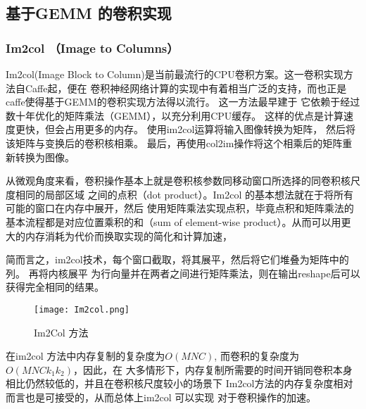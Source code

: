 \subsection{基于GEMM 的卷积实现}

\subsubsection{Im2col （Image to Columns）}

Im2col(Image Block to Column)是当前最流行的CPU卷积方案。这一卷积实现方法自Caffe\cite{Jia2014CaffeCA}起，便在
卷积神经网络计算的实现中有着相当广泛的支持，而也正是caffe使得基于GEMM的卷积实现方法得以流行。
这一方法最早建于\cite{Chellapilla2006HighPC} 它依赖于经过数十年优化的矩阵乘法（GEMM），以充分利用CPU缓存。
这样的优点是计算速度更快，但会占用更多的内存。 使用im2col运算将输入图像转换为矩阵，
然后将该矩阵与变换后的卷积核相乘。 最后，再使用col2im操作将这个相乘后的矩阵重新转换为图像。

从微观角度来看，卷积操作基本上就是卷积核参数同移动窗口所选择的同卷积核尺度相同的局部区域
之间的点积（dot product）。Im2col 的基本想法就在于将所有可能的窗口在内存中展开，然后
使用矩阵乘法实现点积，毕竟点积和矩阵乘法的基本流程都是对应位置乘积的和（sum of element-wise
product）。从而可以用更大的内存消耗为代价而换取实现的简化和计算加速，

简而言之，im2col技术，每个窗口截取，将其展平，然后将它们堆叠为矩阵中的列。 再将内核展平
为行向量并在两者之间进行矩阵乘法，则在输出reshape后可以获得完全相同的结果。
\begin{figure}
	\centering
	\texttt{[image: Im2col.png]}
	\caption{Im2Col 方法}
	\label{fig:im2col}
\end{figure}

% 
% 

在im2col 方法中内存复制的复杂度为$O(MNC)$, 而卷积的复杂度为 $O(MNCk_1k_2)$，因此，在
大多情形下，内存复制所需要的时间开销同卷积本身相比仍然较低的，并且在卷积核尺度较小的场景下
Im2col方法的内存复杂度相对而言也是可接受的，从而总体上im2col 可以实现
对于卷积操作的加速。


